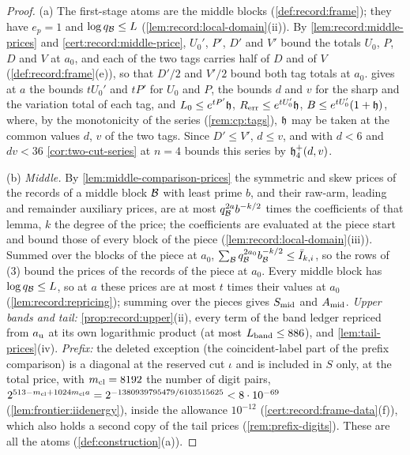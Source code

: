 \begin{proof}
(a) The first-stage atoms are the middle blocks (\cref{def:record:frame}); they
have $e_p=1$ and $\log q_\mathcal B\le L$ (\cref{lem:record:local-domain}(ii)). By
\cref{lem:record:middle-prices} and \cref{cert:record:middle-price}, $U_0'$,
$P'$, $D'$ and $V'$ bound the totals $U_0$, $P$, $D$ and $V$ at $a_0$, and
each of the two tags carries half of $D$ and of $V$
(\cref{def:record:frame}(e)), so that $D'/2$ and $V'/2$ bound both tag totals
at $a_0$.  gives at $a$ the bounds $tU_0'$
and $tP'$ for $U_0$ and $P$, the bounds $d$ and $v$ for the sharp and the
variation total of each tag, and $L_0\le e^{tP'}\mathfrak h$,
$R_{\rm err}\le e^{tU_0'}\mathfrak h$, $B\le e^{tU_0'}(1+\mathfrak h)$, where, by the
monotonicity of the series (\cref{rem:cp:tags}), $\mathfrak h$ may be taken at
the common values $d$, $v$ of the two tags. Since $D'\le V'$, $d\le v$, and
with $d<6$ and $dv<36$ \cref{cor:two-cut-series} at $n=4$ bounds this series
by $\mathfrak h_4^+(d,v)$.

(b) \emph{Middle.} By \cref{lem:middle-comparison-prices} the symmetric and
skew prices of the records of a middle block $\mathcal B$ with least prime $b$, and
their raw-arm, leading and remainder auxiliary prices, are at most
$q_\mathcal B^{2a}b^{-k/2}$ times the coefficients of that lemma, $k$ the degree of
the price; the coefficients are evaluated at the piece start and bound those of
every block of the piece (\cref{lem:record:local-domain}(iii)). Summed over the
blocks of the piece at $a_0$, $\sum_\mathcal B q_\mathcal B^{2a_0}b_\mathcal B^{-k/2}\le\bar I_{k,i}$,
so the rows of (3) bound the prices of the records of the piece at $a_0$.
Every middle block has $\log q_\mathcal B\le L$, so at $a$ these prices are at most
$t$ times their values at $a_0$ (\cref{lem:record:repricing}); summing over
the pieces gives $S_{\rm mid}$ and $A_{\rm mid}$. \emph{Upper bands and tail:}
\cref{prop:record:upper}(ii), every term of the band ledger repriced from
$a_{\rm u}$ at its own logarithmic product (at most $L_{\rm band}\le886$), and
\cref{lem:tail-prices}(iv). \emph{Prefix:} the deleted exception (the coincident-label part of the prefix comparison) is a diagonal at the reserved cut $\iota$ and is included in $S$ only, at the total price, with $m_{\mathrm{cl}}=8192$ the number of digit pairs, $2^{513-m_{\mathrm{cl}}+1024m_{\mathrm{cl}} a}=2^{-1380939795479/6103515625}<8\cdot10^{-69}$
(\cref{lem:frontier:iidenergy}), inside the allowance $10^{-12}$
(\cref{cert:record:frame-data}(f)), which also holds a second copy of the
tail prices (\cref{rem:prefix-digits}). These are all the atoms
(\cref{def:construction}(a)).


\end{proof}
